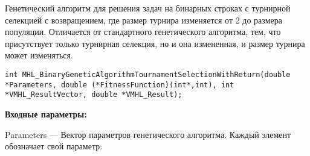 \documentclass[a4paper,12pt]{article}
\begin{document}
Генетический алгоритм для решения задач на бинарных строках с турнирной селекцией с возвращением, где размер турнира изменяется от 2 до размера популяции.
Отличается от стандартного генетического алгоритма, тем, что присутствует только турнирная селекция, но и она измененная, и размер турнира может изменяться.


\begin{lstlisting}[label=code_syntax_MHL_BinaryGeneticAlgorithmTournamentSelectionWithReturn,caption=Синтаксис]
int MHL_BinaryGeneticAlgorithmTournamentSelectionWithReturn(double *Parameters, double (*FitnessFunction)(int*,int), int *VMHL_ResultVector, double *VMHL_Result);
\end{lstlisting}

\textbf{Входные параметры:}
 
Parameters --- Вектор параметров генетического алгоритма. Каждый элемент обозначает свой параметр:
 
\end{document}
